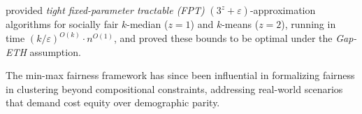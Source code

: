 \cite{DBLP:journals/ipl/GoyalJ23} provided \emph{tight fixed-parameter tractable (FPT)} $(3^z + \varepsilon)$-approximation algorithms for socially fair $k$-median ($z=1$) and $k$-means ($z=2$), running in time $(k/\varepsilon)^{O(k)} \cdot n^{O(1)}$, and proved these bounds to be optimal under the \emph{Gap-ETH} assumption.


The min-max fairness framework has since been influential in formalizing fairness in clustering beyond compositional constraints, addressing real-world scenarios that demand cost equity over demographic parity.
